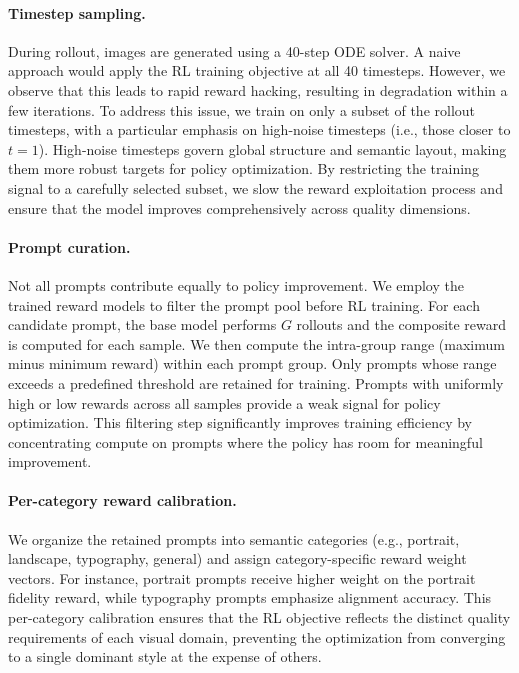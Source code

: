 \documentclass{article} %
\begin{document}
\paragraph{Timestep sampling.} During rollout, images are generated using a 40-step ODE solver. A naive approach would apply the RL training objective at all 40 timesteps. However, we observe that this leads to rapid reward hacking, resulting in degradation within a few iterations. To address this issue, we train on only a subset of the rollout timesteps, with a particular emphasis on high-noise timesteps (i.e., those closer to $t=1$). High-noise timesteps govern global structure and semantic layout, making them more robust targets for policy optimization. By restricting the training signal to a carefully selected subset, we slow the reward exploitation process and ensure that the model improves comprehensively across quality dimensions.

\paragraph{Prompt curation.} Not all prompts contribute equally to policy improvement. We employ the trained reward models to filter the prompt pool before RL training. For each candidate prompt, the base model performs $G$ rollouts and the composite reward is computed for each sample. We then compute the intra-group range (maximum minus minimum reward) within each prompt group. Only prompts whose range exceeds a predefined threshold are retained for training. Prompts with uniformly high or low rewards across all samples provide a weak signal for policy optimization. This filtering step significantly improves training efficiency by concentrating compute on prompts where the policy has room for meaningful improvement.

\paragraph{Per-category reward calibration.} We organize the retained prompts into semantic categories (e.g., portrait, landscape, typography, general) and assign category-specific reward weight vectors. For instance, portrait prompts receive higher weight on the portrait fidelity reward, while typography prompts emphasize alignment accuracy. This per-category calibration ensures that the RL objective reflects the distinct quality requirements of each visual domain, preventing the optimization from converging to a single dominant style at the expense of others.
\end{document}
